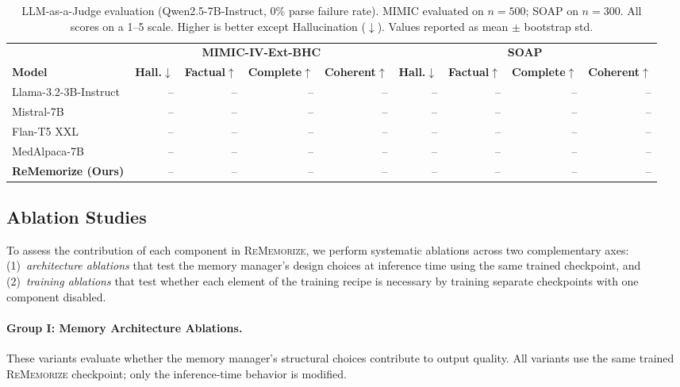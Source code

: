 \documentclass{article}
\begin{document}
\begin{table}[t]
\centering
\caption{LLM-as-a-Judge evaluation (Qwen2.5-7B-Instruct, 0\% parse failure rate).
MIMIC evaluated on $n{=}500$; SOAP on $n{=}300$. All scores on a 1--5 scale.
Higher is better except Hallucination ($\downarrow$). Values reported as mean $\pm$ bootstrap std.}
\label{tab:llm_judge}
\begin{tabular}{lrrrrrrrr}
\toprule
& \multicolumn{4}{c}{\textbf{MIMIC-IV-Ext-BHC}} & \multicolumn{4}{c}{\textbf{SOAP}} \\
\cmidrule(lr){2-5} \cmidrule(lr){6-9}
\textbf{Model} & \textbf{Hall.}$\downarrow$ & \textbf{Factual}$\uparrow$ & \textbf{Complete}$\uparrow$ & \textbf{Coherent}$\uparrow$
               & \textbf{Hall.}$\downarrow$ & \textbf{Factual}$\uparrow$ & \textbf{Complete}$\uparrow$ & \textbf{Coherent}$\uparrow$ \\
\midrule
Llama-3.2-3B-Instruct  & -- & -- & -- & -- & -- & -- & -- & -- \\
Mistral-7B             & -- & -- & -- & -- & -- & -- & -- & -- \\
Flan-T5 XXL           & -- & -- & -- & -- & -- & -- & -- & -- \\
MedAlpaca-7B           & -- & -- & -- & -- & -- & -- & -- & -- \\
\midrule
\textbf{ReMemorize (Ours)} & -- & -- & -- & -- & -- & -- & -- & -- \\
\bottomrule
\end{tabular}
\end{table}


\subsection{Ablation Studies}
\label{sec:ablations}

To assess the contribution of each component in \textsc{ReMemorize}, we perform systematic ablations across two complementary axes: (1)~\emph{architecture ablations} that test the memory manager's design choices at inference time using the same trained checkpoint, and (2)~\emph{training ablations} that test whether each element of the training recipe is necessary by training separate checkpoints with one component disabled.

\paragraph{Group I: Memory Architecture Ablations.}
These variants evaluate whether the memory manager's structural choices contribute to output quality.
All variants use the same trained \textsc{ReMemorize} checkpoint; only the inference-time behavior is modified.
\end{document}
